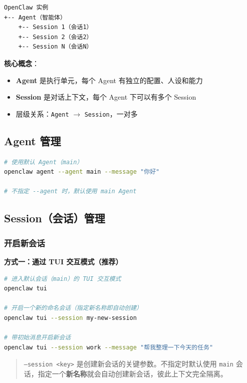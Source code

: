 \begin{lstlisting}
OpenClaw 实例
+-- Agent（智能体）
    +-- Session 1（会话1）
    +-- Session 2（会话2）
    +-- Session N（会话N）
\end{lstlisting}

\textbf{核心概念}：

\begin{itemize}
  \item \textbf{Agent} 是执行单元，每个 Agent 有独立的配置、人设和能力
  \item \textbf{Session} 是对话上下文，每个 Agent 下可以有多个 Session
  \item 层级关系：\texttt{Agent} $\rightarrow$ \texttt{Session}，一对多
\end{itemize}

\subsection{Agent 管理}


\begin{lstlisting}[language=bash]
# 使用默认 Agent（main）
openclaw agent --agent main --message "你好"

# 不指定 --agent 时，默认使用 main Agent
\end{lstlisting}

\subsection{Session（会话）管理}


\subsubsection{开启新会话}


\textbf{方式一：通过 TUI 交互模式（推荐）}

\begin{lstlisting}[language=bash]
# 进入默认会话（main）的 TUI 交互模式
openclaw tui

# 开启一个新的命名会话（指定新名称即自动创建）
openclaw tui --session my-new-session

# 带初始消息开启新会话
openclaw tui --session work --message "帮我整理一下今天的任务"
\end{lstlisting}

\begin{quote}
\texttt{--session <key>} 是创建新会话的关键参数。不指定时默认使用 \texttt{main} 会话，指定一个\textbf{新名称}就会自动创建新会话，彼此上下文完全隔离。
\end{quote}

